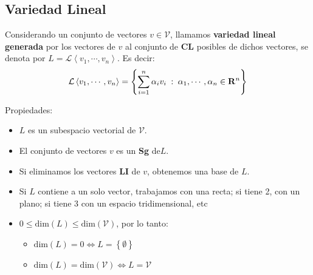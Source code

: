 \subsection{Variedad Lineal}
Considerando un conjunto de vectores \(v \in \mathcal{V}\), llamamos \textbf{variedad lineal generada} por los vectores de \(v\) al conjunto de \textbf{CL} posibles de dichos vectores, se denota por \(L=\mathcal{L}\left\langle v_1, \cdots, v_n\right\rangle \). Es decir:
\[
        \mathcal{L}\left\langle v_1, \cdots, v_n\right\rangle = \left\{\sum_{i=1}^n\alpha_i v_i \hspace{.25em} : \hspace{.25em} \alpha_1,\cdots,\alpha_n \in \mathbf{R}^n\right\}
\]
\vspace{5em}
\par  Propiedades:
\begin{itemize}
        \item \(L\) es un subespacio vectorial de \(\mathcal{V}\).
        \item El conjunto de vectores \(v\) es un \textbf{Sg} de\(L\).
        \item Si eliminamos los vectores \textbf{LI} de \(v\), obtenemos una base de \(L\).
        \item Si \(L\) contiene a un solo vector, trabajamos con una recta; si tiene 2, con un plano; si tiene 3 con un espacio tridimensional, etc
        \item \(0 \leq \text{dim}\left(L\right) \leq \text{dim}\left(\mathcal{V}\right) \), por lo tanto:
              \begin{itemize}
                      \item \(\text{dim}\left(L\right) = 0 \Leftrightarrow L = \left\{\emptyset\right\} \)
                      \item \(\text{dim}\left(L\right) = \text{dim}\left(\mathcal{V}\right) \Leftrightarrow L = \mathcal{V} \)
              \end{itemize}
\end{itemize}
